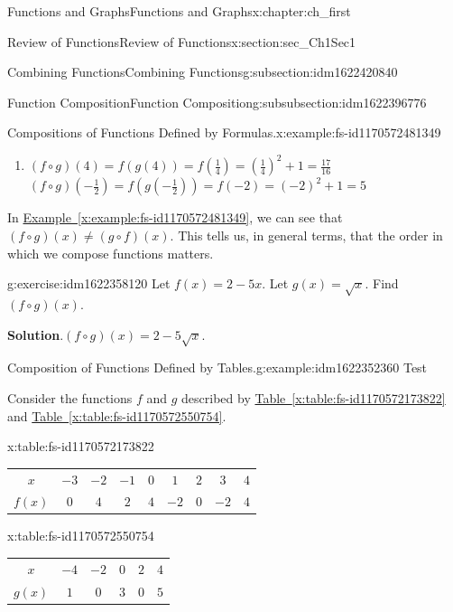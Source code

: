 \documentclass[oneside,10pt,]{book}
\newcommand{\blocktitlefont}{\relax}
\newcommand{\tabularfont}{\relax}
\newcommand{\xreffont}{\relax}
\numberwithin{equation}{section}
\begin{document}
\begin{chapterptx}{Functions and Graphs}{}{Functions and Graphs}{}{}{x:chapter:ch_first}
\begin{sectionptx}{Review of Functions}{}{Review of Functions}{}{}{x:section:sec_Ch1Sec1}
\begin{subsectionptx}{Combining Functions}{}{Combining Functions}{}{}{g:subsection:idm1622420840}
\begin{subsubsectionptx}{Function Composition}{}{Function Composition}{}{}{g:subsubsection:idm1622396776}
\begin{example}{Compositions of Functions Defined by Formulas.}{x:example:fs-id1170572481349}
\begin{enumerate}
\item{}\((f\circ g)(4)=f(g(4))=f(\frac{1}{4})=(\frac{1}{4})^2+1=\frac{17}{16}\) \((f\circ g)(-\frac{1}{2})=f(g(-\frac{1}{2}))=f(-2)=(-2)^2+1=5\)%
\end{enumerate}
\end{example}
In \hyperref[x:example:fs-id1170572481349]{Example~{\xreffont\ref{x:example:fs-id1170572481349}}}, we can see that \((f\circ g)(x)\neq(g\circ f)(x).\) This tells us, in general terms, that the order in which we compose functions matters.%
\begin{inlineexercise}{}{g:exercise:idm1622358120}%
Let \(f(x)=2-5x.\) Let \(g(x)=\sqrt{x}.\) Find \((f\circ g)(x).\)%
\par\smallskip%
\noindent\textbf{\blocktitlefont Solution}.\hypertarget{g:solution:idm1622351208}{}\quad{}\((f\circ g)(x)=2-5\sqrt{x}.\)%
\end{inlineexercise}%
\begin{example}{Composition of Functions Defined by Tables.}{g:example:idm1622352360}%
Test%
\par
Consider the functions \(f\) and \(g\) described by \hyperref[x:table:fs-id1170572173822]{Table~{\xreffont\ref{x:table:fs-id1170572173822}}} and \hyperref[x:table:fs-id1170572550754]{Table~{\xreffont\ref{x:table:fs-id1170572550754}}}.%
\begin{tableptx}{\textbf{}}{x:table:fs-id1170572173822}{}%
\centering%
{\tabularfont%
\begin{tabular}{lllllllll}
\multicolumn{1}{c}{\(x\)}&\multicolumn{1}{c}{\(-3\)}&\multicolumn{1}{c}{\(-2\)}&\multicolumn{1}{c}{\(-1\)}&\multicolumn{1}{c}{\(0\)}&\multicolumn{1}{c}{\(1\)}&\multicolumn{1}{c}{\(2\)}&\multicolumn{1}{c}{\(3\)}&\multicolumn{1}{c}{\(4\)}\tabularnewline[0pt]
\multicolumn{1}{c}{\(f(x)\)}&\multicolumn{1}{c}{\(0\)}&\multicolumn{1}{c}{\(4\)}&\multicolumn{1}{c}{\(2\)}&\multicolumn{1}{c}{\(4\)}&\multicolumn{1}{c}{\(-2\)}&\multicolumn{1}{c}{\(0\)}&\multicolumn{1}{c}{\(-2\)}&\multicolumn{1}{c}{\(4\)}
\end{tabular}
}%
\end{tableptx}%
\begin{tableptx}{\textbf{}}{x:table:fs-id1170572550754}{}%
\centering%
{\tabularfont%
\begin{tabular}{llllll}
\multicolumn{1}{c}{\(x\)}&\multicolumn{1}{c}{\(-4\)}&\multicolumn{1}{c}{\(-2\)}&\multicolumn{1}{c}{\(0\)}&\multicolumn{1}{c}{\(2\)}&\multicolumn{1}{c}{\(4\)}\tabularnewline[0pt]
\multicolumn{1}{c}{\(g(x)\)}&\multicolumn{1}{c}{\(1\)}&\multicolumn{1}{c}{\(0\)}&\multicolumn{1}{c}{\(3\)}&\multicolumn{1}{c}{\(0\)}&\multicolumn{1}{c}{\(5\)}

\end{tabular}}
\end{tableptx}
\end{example}
\end{subsubsectionptx}
\end{subsectionptx}
\end{sectionptx}
\end{chapterptx}
\end{document}
